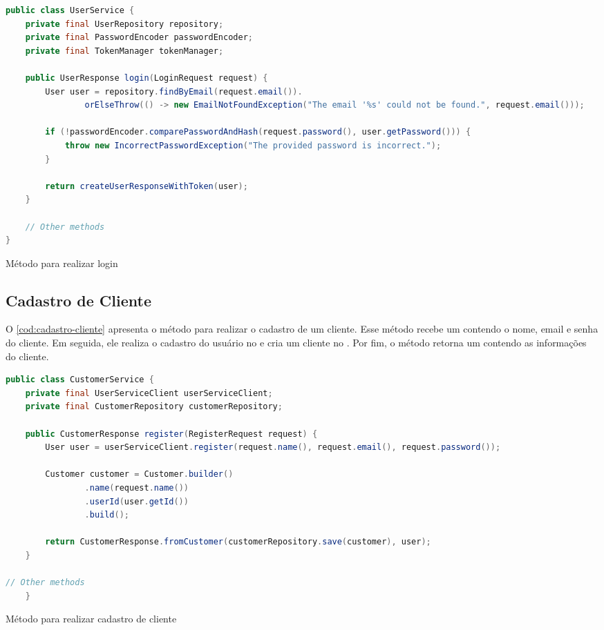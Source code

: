 \begin{codigo}[H]
    \begin{lstlisting}[language=Java]
public class UserService {
    private final UserRepository repository;
    private final PasswordEncoder passwordEncoder;
    private final TokenManager tokenManager;

    public UserResponse login(LoginRequest request) {
        User user = repository.findByEmail(request.email()).
                orElseThrow(() -> new EmailNotFoundException("The email '%s' could not be found.", request.email()));

        if (!passwordEncoder.comparePasswordAndHash(request.password(), user.getPassword())) {
            throw new IncorrectPasswordException("The provided password is incorrect.");
        }

        return createUserResponseWithToken(user);
    }

    // Other methods
}
    \end{lstlisting}
    \caption{Método para realizar login}
    \label{cod:login}
\end{codigo}

\subsection{Cadastro de Cliente}
O \autoref{cod:cadastro-cliente} apresenta o método para realizar o cadastro de um cliente. Esse método recebe um  contendo o nome, email e senha do cliente. Em seguida, ele realiza o cadastro do usuário no  e cria um cliente no . Por fim, o método retorna um  contendo as informações do cliente.

\begin{codigo}[H]
    \begin{lstlisting}[language=Java]
public class CustomerService {
    private final UserServiceClient userServiceClient;
    private final CustomerRepository customerRepository;

    public CustomerResponse register(RegisterRequest request) {
        User user = userServiceClient.register(request.name(), request.email(), request.password());

        Customer customer = Customer.builder()
                .name(request.name())
                .userId(user.getId())
                .build();

        return CustomerResponse.fromCustomer(customerRepository.save(customer), user);
    }

// Other methods
    }
    \end{lstlisting}
    \caption{Método para realizar cadastro de cliente}
    \label{cod:cadastro-cliente}
\end{codigo}

